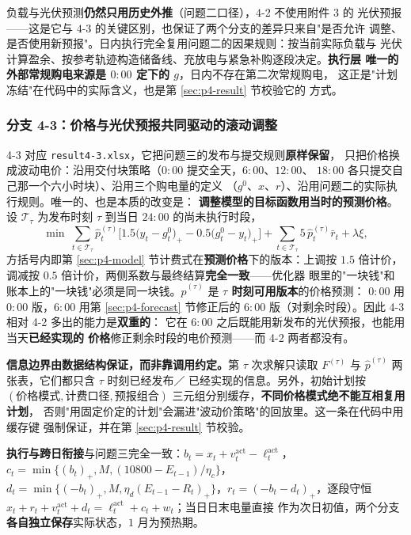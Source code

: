 负载与光伏预测\textbf{仍然只用历史外推}（问题二口径），$4$-2 不使用附件 3 的
光伏预报——这是它与 $4$-3 的关键区别，也保证了两个分支的差异只来自"是否允许
调整、是否使用新预报"。日内执行完全复用问题二的因果规则：按当前实际负载与
光伏计算盈余、按参考轨迹构造储备线、充放电与紧急补购逐段决定。\textbf{执行层
唯一的外部常规购电来源是 $0{:}00$ 定下的 $g$}，日内不存在第二次常规购电，
这正是"计划冻结"在代码中的实际含义，也是第 \ref{sec:p4-result} 节校验它的
方式。

\subsubsection{分支 4-3：价格与光伏预报共同驱动的滚动调整}

4-3 对应 \texttt{result4-3.xlsx}，它把问题三的发布与提交规则\textbf{原样保留}，
只把价格换成波动电价：沿用交付块策略（$0{:}00$ 提交全天，$6{:}00$、$12{:}00$、
$18{:}00$ 各只提交自己那一个六小时块）、沿用三个购电量的定义
（$g^0$、$x$、$r$）、沿用问题二的实际执行规则。唯一的、也是本质的改变是：
\textbf{调整模型的目标函数用当时的预测价格}。设 $\mathcal T_\tau$ 为发布时刻
$\tau$ 到当日 $24{:}00$ 的尚未执行时段，
$$
\min\ \sum_{t\in\mathcal T_\tau}\widehat p^{(\tau)}_t
\Big[1.5\big(y_t-g^0_t\big)_+-0.5\big(g^0_t-y_t\big)_+\Big]
+\sum_{t\in\mathcal T_\tau}5\,\widehat p^{(\tau)}_t \bar r_t+\lambda\xi ,
$$
方括号内即第 \ref{sec:p4-model} 节计费式在\textbf{预测价格}下的版本：上调按
$1.5$ 倍计价，调减按 $0.5$ 倍计价，两侧系数与最终结算\textbf{完全一致}——优化器
眼里的"一块钱"和账本上的"一块钱"必须是同一块钱。$\widehat p^{(\tau)}$ 是
\textbf{$\tau$ 时刻可用版本}的价格预测：
$0{:}00$ 用 $0{:}00$ 版，$6{:}00$ 用第 \ref{sec:p4-forecast} 节修正后的
$6{:}00$ 版（对剩余时段）。因此 4-3 相对 4-2 多出的能力是\textbf{双重的}：
它在 $6{:}00$ 之后既能用新发布的光伏预报，也能用当天\textbf{已经实现的
价格}修正剩余时段的电价预测——而 4-2 两者都没有。

\textbf{信息边界由数据结构保证，而非靠调用约定。}第 $\tau$ 次求解只读取
$F^{(\tau)}$ 与 $\widehat p^{(\tau)}$ 两张表，它们都只含 $\tau$ 时刻已经发布／
已经实现的信息。另外，初始计划按 $(\text{价格模式},\text{计费口径},
\text{预报组合})$ 三元组分别缓存，\textbf{不同价格模式绝不能互相复用计划}，
否则"用固定价定的计划"会漏进"波动价策略"的回放里。这一条在代码中用缓存键
强制保证，并在第 \ref{sec:p4-result} 节校验。

\textbf{执行与跨日衔接}与问题三完全一致：$b_t=x_t+v_t^{\mathrm{act}}-
\ell_t^{\mathrm{act}}$，$c_t=\min\{(b_t)_+,M,(10800-E_{t-1})/\eta_c\}$，
$d_t=\min\{(-b_t)_+,M,\eta_d(E_{t-1}-R_t)_+\}$，$r_t=(-b_t-d_t)_+$，逐段守恒
$x_t+r_t+v_t^{\mathrm{act}}+d_t=\ell_t^{\mathrm{act}}+c_t+w_t$；当日日末电量直接
作为次日初值，两个分支\textbf{各自独立保存}实际状态，$1$ 月为预热期。

